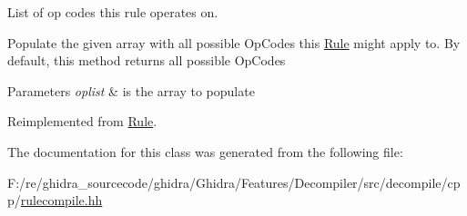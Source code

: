 List of op codes this rule operates on. 

Populate the given array with all possible Op\+Codes this \mbox{\hyperlink{class_rule}{Rule}} might apply to. By default, this method returns all possible Op\+Codes 
\begin{DoxyParams}{Parameters}
{\em oplist} & is the array to populate \\
\hline
\end{DoxyParams}


Reimplemented from \mbox{\hyperlink{class_rule_a4023bfc7825de0ab866790551856d10e}{Rule}}.



The documentation for this class was generated from the following file\+:\begin{DoxyCompactItemize}
\item 
F\+:/re/ghidra\+\_\+sourcecode/ghidra/\+Ghidra/\+Features/\+Decompiler/src/decompile/cpp/\mbox{\hyperlink{rulecompile_8hh}{rulecompile.\+hh}}\end{DoxyCompactItemize}
